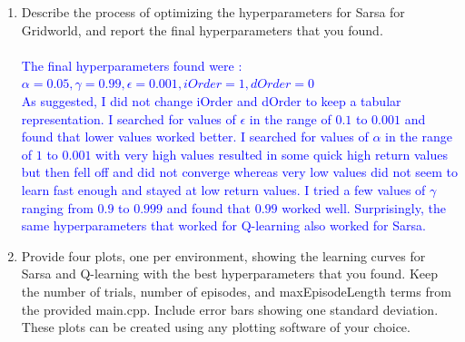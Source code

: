 \documentclass[]{article}
\begin{document}
\begin{enumerate}
    \item Describe the process of optimizing the hyperparameters for Sarsa for Gridworld, and report the final hyperparameters that you found.
    \\\\
    \textcolor{blue}{
    	The final hyperparameters found were :\\
    	$
    		\alpha  = 0.05,
    		\gamma = 0.99,
    		\epsilon = 0.001,
    		iOrder = 1,
    		dOrder = 0
    	$\\
    	As suggested, I did not change iOrder and dOrder to keep a tabular representation. I searched for values of $\epsilon$ in the range of $0.1$ to $0.001$ and found that lower values worked better. I searched for values of $\alpha$ in the range of $1$ to $0.001$ with very high values resulted in some quick high return values but then fell off and did not converge whereas very low values did not seem to learn fast enough and stayed at low return values. I tried a few values of $\gamma$ ranging from $0.9$ to $0.999$ and found that $0.99$ worked well. Surprisingly, the same hyperparameters that worked for Q-learning also worked for Sarsa.
    }
    
    \item Provide four plots, one per environment, showing the learning curves for Sarsa and Q-learning with the best hyperparameters that you found. Keep the number of trials, number of episodes, and maxEpisodeLength terms from the provided main.cpp. Include error bars showing one standard deviation. These plots can be created using any plotting software of your choice.
    

\end{enumerate}
\end{document}
